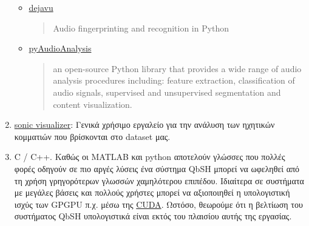 \begin{enumerate}
\begin{itemize}
        \item \href{https://github.com/worldveil/dejavu}{dejavu}
        \blockquote{Audio fingerprinting and recognition in Python}

        \item \href{https://github.com/tyiannak/pyAudioAnalysis}{pyAudioAnalysis}
        \blockquote{an open-source Python library that provides a wide range of audio analysis procedures including: feature extraction, classification of audio signals, supervised and unsupervised segmentation and content visualization.}
    \end{itemize}

    \item \href{http://sonicvisualiser.org/}{sonic visualizer}:
    Γενικά χρήσιμο εργαλείο για την ανάλυση των ηχητικών κομματιών που βρίσκονται στο dataset μας.

    \item C / C++.
    Καθώς οι MATLAB και python αποτελούν γλώσσες που πολλές φορές οδηγούν σε πιο αργές λύσεις ένα σύστημα QbSH μπορεί να ωφεληθεί από τη χρήση γρηγορότερων γλωσσών χαμηλότερου επιπέδου.
    Ιδιαίτερα σε συστήματα με μεγάλες βάσεις και πολλούς χρήστες μπορεί να αξιοποιηθεί η υπολογιστική ισχύς των GPGPU π.χ. μέσω της
    \href{http://www.nvidia.com/object/cuda_home_new.html}{CUDA}.
    Ωστόσο, θεωρούμε ότι η βελτίωση του συστήματος QbSH υπολογιστικά είναι εκτός του πλαισίου αυτής της εργασίας.
\end{enumerate}
